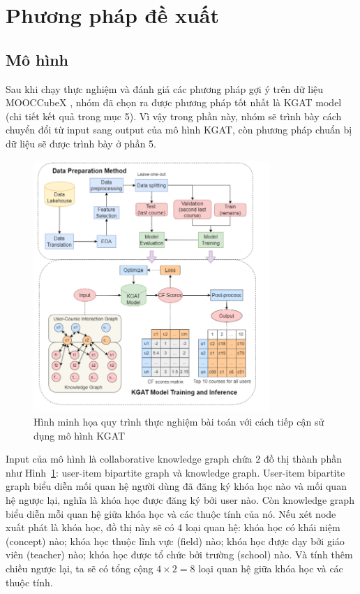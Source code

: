 \section{Phương pháp đề xuất}

\subsection{Mô hình}
Sau khi chạy thực nghiệm và đánh giá các phương pháp gợi ý trên dữ liệu MOOCCubeX \cite{mooccubex}, nhóm đã chọn ra được phương pháp tốt nhất là KGAT model (chi tiết kết quả trong mục 5). Vì vậy trong phần này, nhóm sẽ trình bày cách chuyển đổi từ input sang output của mô hình KGAT, còn phương pháp chuẩn bị dữ liệu sẽ được trình bày ở phần 5.

\begin{figure}[h]
    \centering
    \includegraphics[width=0.8\textwidth]{figures/69.png}
    \caption{Hình minh họa quy trình thực nghiệm bài toán với cách tiếp cận sử dụng mô hình KGAT}
    \label{fig:image1}
\end{figure}

Input của mô hình là collaborative knowledge graph chứa 2 đồ thị thành phần như Hình~\ref{fig:image1}: user-item bipartite graph và knowledge graph. User-item bipartite graph biểu diễn mối quan hệ người dùng đã đăng ký khóa học nào và mối quan hệ ngược lại, nghĩa là khóa học được đăng ký bởi user nào. Còn knowledge graph biểu diễn mỗi quan hệ giữa khóa học và các thuộc tính của nó. Nếu xét node xuất phát là khóa học, đồ thị này sẽ có 4 loại quan hệ: khóa học có khái niệm (concept) nào; khóa học thuộc lĩnh vực (field) nào; khóa học được dạy bởi giáo viên (teacher) nào; khóa học được tổ chức bởi trường (school) nào. Và tính thêm chiều ngược lại, ta sẽ có tổng cộng $4 \times 2 = 8$ loại quan hệ giữa khóa học và các thuộc tính.

